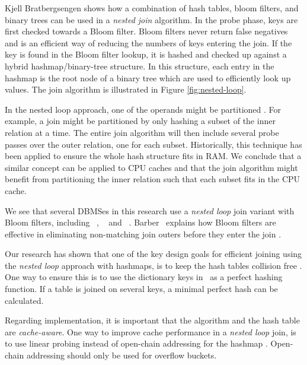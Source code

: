 
Kjell Bratbergsengen shows how a combination of hash tables, bloom filters, and binary trees can be used in a \textit{nested join} algorithm. In the probe phase, keys are first checked towards a Bloom filter. Bloom filters never return false negatives and is an efficient way of reducing the numbers of keys entering the join. If the key is found in the Bloom filter lookup, it is hashed and checked up against a hybrid hashmap/binary-tree structure. In this structure, each entry in the hashmap is the root node of a binary tree which are used to efficiently look up values. The join algorithm is illustrated in Figure \ref{fig:nested-loop}.

In the nested loop approach, one of the operands might be partitioned \cite{Bratbergsengen2015-ed}. For example, a join might be partitioned by only hashing a subset of the inner relation at a time. The entire join algorithm will then include several probe passes over the outer relation, one for each subset. Historically, this technique has been applied to ensure the whole hash structure fits in RAM. We conclude that a similar concept can be applied to CPU caches and that the join algorithm might benefit from partitioning the inner relation such that each subset fits in the CPU cache.

We see that several DBMSes in this research use a \textit{nested loop} join variant with Bloom filters, including \oracle~\cite{Lahiri2015-mz}, \ibm~\cite{Raman2013-em} and \blink~\cite{Raman2008-gi}. Barber \ea~explains how Bloom filters are effective in eliminating non-matching join outers before they enter the join \cite{Barber2014-ey}.

Our research has shown that one of the key design goals for efficient joining using the \textit{nested loop} approach with hashmaps, is to keep the hash tables collision free \cite{Raman2008-gi, Raman2013-em}. One way to ensure this is to use the dictionary keys in \de~as a perfect hashing function. If a table is joined on several keys, a minimal perfect hash can be calculated.

Regarding implementation, it is important that the algorithm and the hash table are \textit{cache-aware}. One way to improve cache performance in a \textit{nested loop} join, is to use linear probing instead of open-chain addressing for the hashmap \cite{Raman2008-gi}. Open-chain addressing should only be used for overflow buckets.


